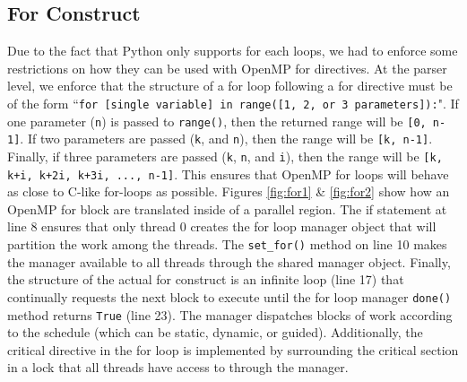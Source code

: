 \documentclass[letterpaper,12pt]{article} %
\begin{document}
\subsection{For Construct}
Due to the fact that Python only supports for each loops, we had to enforce some restrictions on how they can be used with OpenMP for directives. At the parser level, we enforce that the structure of a for loop following a for directive must be of the form  ``\texttt{for [single variable] in range([1, 2, or 3 parameters]):}". If one parameter (\texttt{n}) is passed to \texttt{range()}, then the returned range will be \texttt{[0, n-1]}. If two parameters are passed (\texttt{k}, and \texttt{n}), then the range will be \texttt{[k, n-1]}. Finally, if three parameters are passed (\texttt{k}, \texttt{n}, and \texttt{i}), then the range will be \texttt{[k, k+i, k+2i, k+3i, ..., n-1]}. This ensures that OpenMP for loops will behave as close to C-like for-loops as possible. Figures \ref{fig:for1} \& \ref{fig:for2} show how an OpenMP for block are translated inside of a parallel region. The if statement at line 8 ensures that only thread 0 creates the for loop manager object that will partition the work among the threads. The \texttt{set\_for()} method on line 10 makes the manager available to all threads through the shared manager object. Finally, the structure of the actual for construct is an infinite loop (line 17) that continually requests the next block to execute until the for loop manager \texttt{done()} method returns \texttt{True} (line 23). The manager dispatches blocks of work according to the schedule (which can be static, dynamic, or guided). Additionally, the critical directive in the for loop is implemented by surrounding the critical section in a lock that all threads have access to through the manager. 
\end{document}
